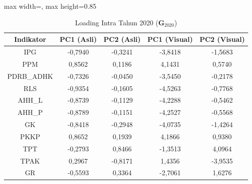 \begin{table}[H]
\centering
\caption{Loading Intra Tahun 2020 ($\mathbf{G}_{2020}$)} \label{tab:app2loading_intra_2020}
\begin{adjustbox}{max width=\textwidth, max height=0.85\textheight}
\begin{tabular}{|c|c|c|c|c|}
\hline
\textbf{Indikator} & \textbf{PC1 (Asli)} & \textbf{PC2 (Asli)} & \textbf{PC1 (Visual)} & \textbf{PC2 (Visual)} \\
\hline
IPG & -0,7940 & -0,3241 & -3,8418 & -1,5683 \\
PPM & 0,8562 & 0,1186 & 4,1431 & 0,5740 \\
PDRB\_ADHK & -0,7326 & -0,0450 & -3,5450 & -0,2178 \\
RLS & -0,9354 & -0,1605 & -4,5263 & -0,7768 \\
AHH\_L & -0,8739 & -0,1129 & -4,2288 & -0,5462 \\
AHH\_P & -0,8789 & -0,1151 & -4,2527 & -0,5568 \\
GK & -0,8418 & -0,2948 & -4,0735 & -1,4264 \\
PKKP & 0,8652 & 0,1939 & 4,1866 & 0,9380 \\
TPT & -0,2793 & 0,8466 & -1,3513 & 4,0964 \\
TPAK & 0,2967 & -0,8171 & 1,4356 & -3,9535 \\
GR & -0,5593 & 0,3364 & -2,7061 & 1,6276 \\
\hline
\end{tabular}
\end{adjustbox}
\end{table}
